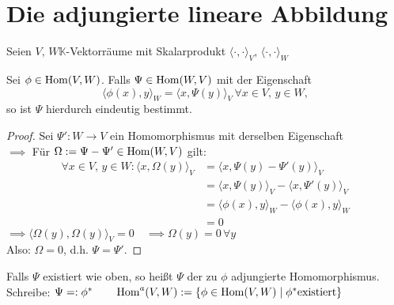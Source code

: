 \documentclass[parskip,a4paper,twoside,DIV15,BCOR12mm]{scrbook}
\begin{document}
\section{Die adjungierte lineare Abbildung}
Seien \(V,\,W \mathbb{K}\)-Vektorräume mit Skalarprodukt 
\(\langle\cdot,\cdot\rangle_{V},\,\langle\cdot,\cdot\rangle_{W}\)
\begin{lemma}
Sei \(\phi\in\operatorname{Hom}(V,W)\). Falls \(\Psi\in\operatorname{Hom}(W,V)\) mit der Eigenschaft
\[
\langle\phi(x),y\rangle_{W}=\langle x,\Psi(y)\rangle_{V}\,\forall x\in V,\,
y\in W,
\]
so ist \(\Psi\) hierdurch eindeutig bestimmt.
\end{lemma}
\begin{proof}
Sei \(\Psi':W\to V\) ein Homomorphismus mit derselben Eigenschaft\\
\(\implies\) Für \(\Omega:=\Psi-\Psi'\in\operatorname{Hom}(W,V)\) gilt:
\begin{align*}
\forall x\in V,\,y\in W: \langle x,\Omega(y)\rangle_{V}&=
\langle x,\Psi(y)-\Psi'(y)\rangle_{V}\\
&=\langle x,\Psi(y)\rangle_{V}-\langle x,\Psi'(y)\rangle_{V}\\
&=\langle\phi(x),y\rangle_{W}-\langle\phi(x),y\rangle_{W}\\
&=0
\end{align*}
\(\implies \langle\Omega(y),\Omega(y)\rangle_{V}=0\quad\implies
\Omega(y)=0\,\forall y\)\\
Also: \(\Omega=0\), d.h. \(\Psi =\Psi'\).
\end{proof}

\begin{definition}
Falls \(\Psi\) existiert wie oben, so heißt \(\Psi\) der zu \(\phi\) 
adjungierte Homomorphismus.\\
Schreibe: \(\Psi =:\phi^{*}\qquad\operatorname{Hom}^{a}(V,W):=\{\phi\in\operatorname{Hom}(V,W)\mid\phi^{*}\text{existiert}\}\)
\end{definition}
\end{document}
